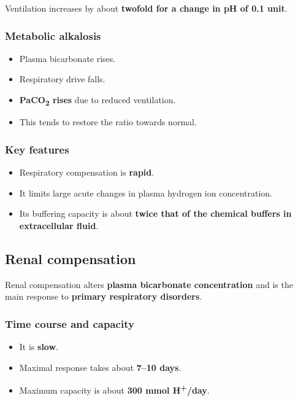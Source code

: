 \documentclass[11pt,a4paper]{article}
\begin{document}
Ventilation increases by about \textbf{twofold for a change in pH of 0.1 unit}.

\subsubsection{Metabolic alkalosis}

\begin{itemize}
  \item Plasma bicarbonate rises.
  \item Respiratory drive falls.
  \item \textbf{PaCO\textsubscript{2} rises} due to reduced ventilation.
  \item This tends to restore the ratio towards normal.
\end{itemize}

\subsubsection{Key features}

\begin{itemize}
  \item Respiratory compensation is \textbf{rapid}.
  \item It limits large acute changes in plasma hydrogen ion concentration.
  \item Its buffering capacity is about \textbf{twice that of the chemical buffers in extracellular fluid}.
\end{itemize}

\subsection{Renal compensation}

Renal compensation alters \textbf{plasma bicarbonate concentration} and is the main response to \textbf{primary respiratory disorders}.

\subsubsection{Time course and capacity}

\begin{itemize}
  \item It is \textbf{slow}.
  \item Maximal response takes about \textbf{7--10 days}.
  \item Maximum capacity is about \textbf{300 mmol H\textsuperscript{+}/day}.
\end{itemize}
\end{document}
